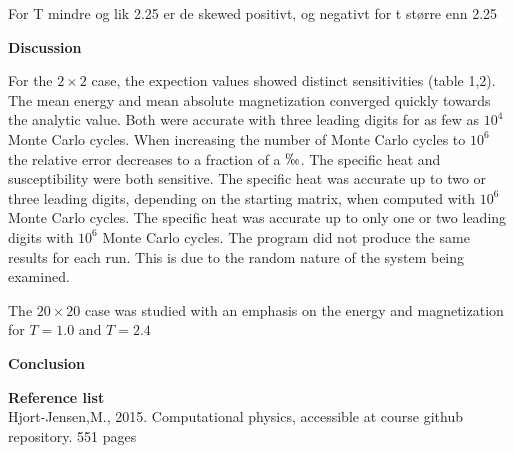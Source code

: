 \documentclass[10pt,a4paper]{article}
\begin{document}
For T mindre og lik 2.25 er de skewed positivt, og negativt for t større enn 2.25

  





\newpage
{\LARGE\bf
Discussion 
}

For the $2 \times 2$ case, the expection values showed distinct sensitivities (table 1,2). The mean energy and mean absolute magnetization converged quickly towards the analytic value. Both were accurate with three leading digits for as few as $10^4$ Monte Carlo cycles. When increasing the number of Monte Carlo cycles to $10^6$ the relative error decreases to a fraction of a $\permil$. The specific heat and susceptibility were both sensitive. The specific heat was accurate up to two or three leading digits, depending on the starting matrix, when computed with $10^6$ Monte Carlo cycles. The specific heat was accurate up to only one or two leading digits with $10^6$ Monte Carlo cycles. The program did not produce the same results for each run. This is due to the random nature of the system being examined.

The $20 \times 20$ case was studied with an emphasis on the energy and magnetization for $T=1.0$ and $T=2.4$
  








\newpage
{\LARGE\bf
Conclusion
}
















\newpage
{\LARGE\bf
Reference list
}\\
Hjort-Jensen,M., 2015. Computational physics, accessible at course github repository. 551 pages
\end{document}
